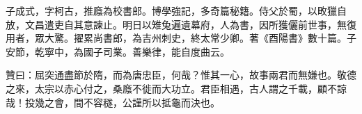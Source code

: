 \begin{pinyinscope}
 子成式，字柯古，推廕為校書郎。博學強記，多奇篇秘籍。侍父於蜀，以畋獵自放，文昌遣吏自其意諫止。明日以雉兔遍遺幕府，人為書，因所獲儷前世事，無復用者，眾大驚。擢累尚書郎，為吉州刺史，終太常少卿。著《酉陽書》數十篇。子安節，乾寧中，為國子司業。善樂律，能自度曲云。



 贊曰：屈突通盡節於隋，而為唐忠臣，何哉？惟其一心，故事兩君而無嫌也。敬德之來，太宗以赤心付之，桑廕不徙而大功立。君臣相遇，古人謂之千載，顧不諒哉！投幾之會，間不容穟，公謹所以抵龜而決也。



\end{pinyinscope}